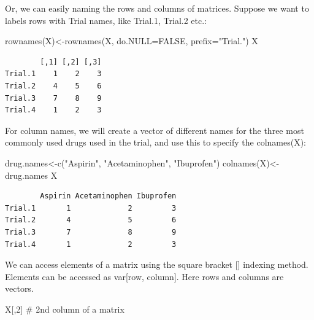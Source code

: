 \documentclass[
  letterpaper,
  DIV=11,
  numbers=noendperiod]{scrreprt}
\newenvironment{Shaded}{\begin{snugshade}}{\end{snugshade}}
\newcommand{\AttributeTok}[1]{\textcolor[rgb]{0.40,0.45,0.13}{#1}}
\newcommand{\CommentTok}[1]{\textcolor[rgb]{0.37,0.37,0.37}{#1}}
\newcommand{\ConstantTok}[1]{\textcolor[rgb]{0.56,0.35,0.01}{#1}}
\newcommand{\DecValTok}[1]{\textcolor[rgb]{0.68,0.00,0.00}{#1}}
\newcommand{\FunctionTok}[1]{\textcolor[rgb]{0.28,0.35,0.67}{#1}}
\newcommand{\NormalTok}[1]{\textcolor[rgb]{0.00,0.23,0.31}{#1}}
\newcommand{\OtherTok}[1]{\textcolor[rgb]{0.00,0.23,0.31}{#1}}
\newcommand{\StringTok}[1]{\textcolor[rgb]{0.13,0.47,0.30}{#1}}
\begin{document}
Or, we can easily naming the rows and columns of matrices. Suppose we
want to labels rows with Trial names, like Trial.1, Trial.2 etc.:

\begin{Shaded}
\begin{Highlighting}[]
\FunctionTok{rownames}\NormalTok{(X)}\OtherTok{\textless{}{-}}\FunctionTok{rownames}\NormalTok{(X, }\AttributeTok{do.NULL=}\ConstantTok{FALSE}\NormalTok{, }\AttributeTok{prefix=}\StringTok{"Trial."}\NormalTok{)}
\NormalTok{X}
\end{Highlighting}
\end{Shaded}

\begin{verbatim}
        [,1] [,2] [,3]
Trial.1    1    2    3
Trial.2    4    5    6
Trial.3    7    8    9
Trial.4    1    2    3
\end{verbatim}

For column names, we will create a vector of different names for the
three most commonly used drugs used in the trial, and use this to
specify the colnames(X):

\begin{Shaded}
\begin{Highlighting}[]
\NormalTok{drug.names}\OtherTok{\textless{}{-}}\FunctionTok{c}\NormalTok{(}\StringTok{"Aspirin"}\NormalTok{, }\StringTok{"Acetaminophen"}\NormalTok{, }\StringTok{"Ibuprofen"}\NormalTok{)}
\FunctionTok{colnames}\NormalTok{(X)}\OtherTok{\textless{}{-}}\NormalTok{drug.names}
\NormalTok{X}
\end{Highlighting}
\end{Shaded}

\begin{verbatim}
        Aspirin Acetaminophen Ibuprofen
Trial.1       1             2         3
Trial.2       4             5         6
Trial.3       7             8         9
Trial.4       1             2         3
\end{verbatim}

We can access elements of a matrix using the square bracket {[}{]}
indexing method. Elements can be accessed as var{[}row, column{]}. Here
rows and columns are vectors.

\begin{Shaded}
\begin{Highlighting}[]
\NormalTok{X[,}\DecValTok{2}\NormalTok{]  }\CommentTok{\# 2nd column of a matrix}
\end{Highlighting}
\end{Shaded}
\end{document}
